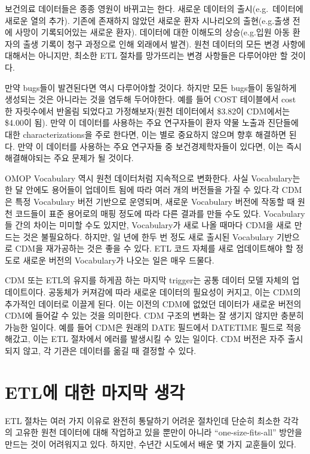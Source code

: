\documentclass[11pt]{book}
\theoremstyle{definition}
\theoremstyle{definition}
\theoremstyle{definition}
\theoremstyle{remark}
\begin{document}
보건의료 데이터들은 종종 영원이 바뀌고는 한다. 새로운 데이터의
출시(e.g.~데이터에 새로운 열의 추가). 기존에 존재하지 않았던 새로운 환자
시나리오의 출현(e.g.출생 전에 사망이 기록되어있는 새로운 환자). 데이터에
대한 이해도의 상승(e.g.입원 아동 환자의 출생 기록이 청구 과정으로 인해
외래에서 발견). 원천 데이터의 모든 변경 사항에 대해서는 아니지만, 최소한
ETL 절차를 망가뜨리는 변경 사항들은 다루어야만 할 것이다.

만약 bugs들이 발견된다면 역시 다루어야할 것이다. 하지만 모든 bugs들이
동일하게 생성되는 것은 아니라는 것을 염두해 두어야한다. 예를 들어 COST
테이블에서 cost 한 자릿수에서 반올림 되었다고 가정해보자(원천 데이터에서
\$3.82이 CDM에서는 \$4.00이 됨). 만약 이 데이터를 사용하는 주요
연구자들이 환자 약물 노출과 진단들에 대한 characterizations을 주로
한다면, 이는 별로 중요하지 않으며 향후 해결하면 된다. 만약 이 데이터를
사용하는 주요 연구자들 중 보건경제학자들이 있다면, 이는 즉시
해결해야되는 주요 문제가 될 것이다.

OMOP Vocabulary 역시 원천 데이터처럼 지속적으로 변화한다. 사실
Vocabulary는 한 달 안에도 용어들이 업데이트 됨에 따라 여러 개의 버전들을
가질 수 있다.각 CDM은 특정 Vocabulary 버전 기반으로 운영되며, 새로운
Vocabulary 버전에 작동할 때 원천 코드들이 표준 용어로의 매핑 정도에 따라
다른 결과를 만들 수도 있다. Vocabulary들 간의 차이는 미미할 수도 있지만,
Vocabulary가 새로 나올 때마다 CDM을 새로 만드는 것은 불필요하다. 하지만,
일 년에 한두 번 정도 새로 출시된 Vocabulary 기반으로 CDM을 재가공하는
것은 좋을 수 있다. ETL 코드 자체를 새로 업데이트해야 할 정도로 새로운
버전의 Vocabulary가 나오는 일은 매우 드물다.

CDM 또는 ETL의 유지를 하게끔 하는 마지막 trigger는 공통 데이터 모델
자체의 업데이트이다. 공동체가 커져감에 따라 새로운 데이터의 필요성이
커지고, 이는 CDM의 추가적인 데이터로 이끌게 된다. 이는 이전의 CDM에
없었던 데이터가 새로운 버전의 CDM에 들어갈 수 있는 것을 의미한다. CDM
구조의 변화는 잘 생기지 않지만 충분히 가능한 일이다. 예를 들어 CDM은
원래의 DATE 필드에서 DATETIME 필드로 적응해갔고, 이는 ETL 절차에서
에러를 발생시킬 수 있는 일이다. CDM 버전은 자주 출시되지 않고, 각 기관은
데이터를 옮길 때 결정할 수 있다.

\section{ETL에 대한 마지막 생각}\label{etl---}

ETL 절차는 여러 가지 이유로 완전히 통달하기 어려운 절차인데 단순히
최소한 각각의 고유한 원천 데이터에 대해 작업하고 있을 뿐만이 아니라
``one-size-fits-all'' 방안을 만드는 것이 어려워지고 있다. 하지만, 수년간
시도에서 배운 몇 가지 교훈들이 있다.
\end{document}
